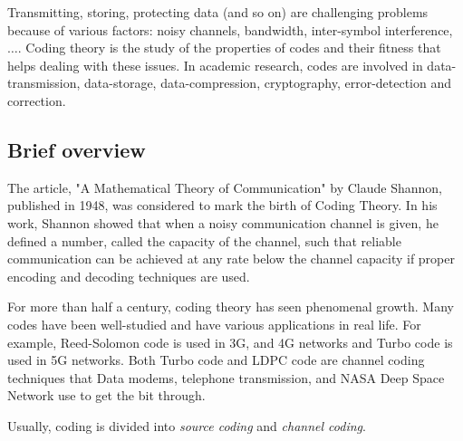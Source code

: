 Transmitting, storing, protecting data (and so on) are challenging problems because of various factors: noisy channels, bandwidth, inter-symbol interference, $\ldots$. Coding theory is the study of the properties of codes and their fitness that helps dealing with these issues. In academic research, codes are involved in data-transmission, data-storage, data-compression, cryptography, error-detection and correction. 

\subsection{Brief overview}\label{subsec:brief_overview}
The article, "A Mathematical Theory of Communication" by Claude Shannon, published in 1948, was considered to mark the birth of Coding Theory. In his work, Shannon showed that when a noisy communication channel is given, he defined a number, called the capacity of the channel, such that reliable communication can be achieved at any rate below the channel capacity if proper encoding and decoding techniques are used. 


For more than half a century, coding theory has seen phenomenal growth. Many codes have been well-studied and have various applications in real life. For example, Reed-Solomon code is used in 3G, and 4G networks and Turbo code is used in 5G networks. Both Turbo code and LDPC code are channel coding techniques that Data modems, telephone transmission, and NASA Deep Space Network use to get the bit through. 

Usually, coding is divided into \textit{source coding} and \textit{channel coding}. 

